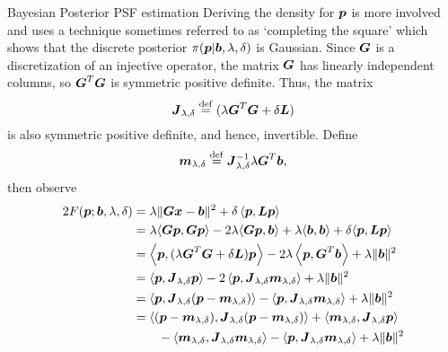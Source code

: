 \begin{chapter}{Bayesian Posterior PSF estimation}
Deriving the density for $\mbox{\boldmath$p$}$ is more involved and uses a technique sometimes referred to as `completing the square' \citep{stuart2010} which shows that the discrete posterior $\pi(\mbox{\boldmath$p$}|\mbox{\boldmath$b$},\lambda,\delta)$ is Gaussian.
Since $\mbox{\boldmath$G$}$ is a discretization of an injective operator, the matrix $\mbox{\boldmath$G$}$ has linearly independent columns, so $\mbox{\boldmath$G$}^T \mbox{\boldmath$G$}$ is symmetric positive definite.
Thus, the matrix 
\begin{equation} \label{eq:regularizationOperator}
  \mbox{\boldmath$J$}_{\lambda,\delta} \stackrel{\rm def}{=} (\lambda \mbox{\boldmath$G$}^T\mbox{\boldmath$G$} + \delta \mbox{\boldmath$L$})
\end{equation}
is also symmetric positive definite, and hence, invertible.
Define
\begin{equation} \label{eq:computeMAP}
  \mbox{\boldmath$m$}_{\lambda,\delta} \stackrel{\rm def}{=} \mbox{\boldmath$J$}_{\lambda,\delta}^{-1}\lambda \mbox{\boldmath$G$}^T\mbox{\boldmath$b$},
\end{equation} 
then observe
\begin{align}
  2F(\vect p; \vect b,\lambda,\delta) 
  &= \lambda\|\vect{Gx} - \vect b\|^2 + \delta\left\langle \vect p, \vect L \vect p\right\rangle \nonumber \\
  &= \lambda\langle \vect G\vect p,\vect G \vect p\rangle -2\lambda\langle \vect G\vect p,\vect b\rangle + \lambda\langle \vect b,\vect b\rangle + \delta \langle\vect p,\vect L\vect p\rangle \nonumber\\
  &= \left\langle \vect p,( \lambda \vect G^T \vect G + \delta \vect L)\vect p\right\rangle - 2 \lambda \left\langle \vect p, \vect G^T \vect b\right\rangle + \lambda \|\vect b\|^2\nonumber \\
  &= \left\langle \vect p,\vect J_{\lambda,\delta}\vect p\right\rangle - 2 \left\langle \vect p, \vect J_{\lambda,\delta}\vect m_{\lambda,\delta}\right\rangle + \lambda \|\vect b\|^2\nonumber \\
  &= \left\langle \vect p,\vect J_{\lambda,\delta}(\vect p - \vect m_{\lambda,\delta})\right\rangle - \left\langle \vect p, \vect J_{\lambda,\delta}\vect m_{\lambda,\delta}\right\rangle + \lambda \|\vect b\|^2\nonumber \\
  &= \left\langle (\vect p-\vect m_{\lambda,\delta}),\vect J_{\lambda,\delta}(\vect p - \vect m_{\lambda,\delta})\right \rangle  + \langle \vect m_{\lambda,\delta},\vect J_{\lambda,\delta}\vect p\rangle \nonumber\\
  &\quad\quad- \langle \vect m_{\lambda,\delta},\vect J_{\lambda,\delta}\vect m_{\lambda,\delta}\rangle - \left\langle \vect p, \vect J_{\lambda,\delta}\vect m_{\lambda,\delta}\right\rangle + \lambda \|\vect b\|^2\nonumber \\

\end{align}
\end{chapter}
